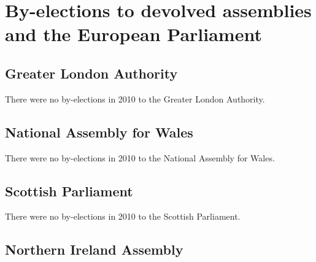 \chapter{By-elections to devolved assemblies and the European Parliament}

\section{Greater London Authority}

There were no by-elections in 2010 to the Greater London Authority.

\section{National Assembly for Wales}

There were no by-elections in 2010 to the National Assembly for Wales.

\section{Scottish Parliament}

There were no by-elections in 2010 to the Scottish Parliament.

\section{Northern Ireland Assembly}

